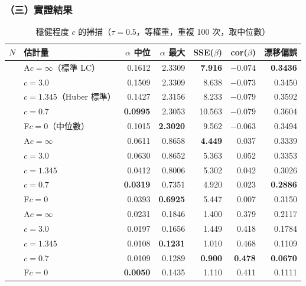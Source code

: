 \documentclass[UTF8, fontset=macnew, a4paper, 12pt]{ctexart}
\begin{document}
\subsubsection{（三）實證結果}

\begin{table}[H]
\centering
\caption{穩健程度 $c$ 的掃描（$\tau=0.5$，等權重，重複 100 次，取中位數）}
\small
\begin{tabular}{llrrrrr}
\toprule
$N$ & 估計量 & $\alpha$ 中位 & $\alpha$ 最大 & SSE($\beta$) & cor($\beta$) & 漂移偏誤\\
\midrule
{}
 & A\quad $c=\infty$（標準 LC）  & 0.1612 & 2.3309 & \textbf{7.916} & $-0.074$ & \textbf{0.3436}\\
 & $c=3.0$                      & 0.1509 & 2.3309 & 8.638 & $-0.073$ & 0.3450\\
 & $c=1.345$（Huber 標準）      & 0.1427 & 2.3156 & 8.233 & $-0.079$ & 0.3592\\
 & $c=0.7$                      & \textbf{0.0995} & 2.3053 & 10.563 & $-0.079$ & 0.3604\\
 & F\quad $c=0$（中位數）        & 0.1015 & \textbf{2.3020} & 9.562 & $-0.063$ & 0.3494\\
\midrule
{}
 & A\quad $c=\infty$            & 0.0611 & 0.8658 & \textbf{4.449} & 0.037 & 0.3339\\
 & $c=3.0$                      & 0.0630 & 0.8652 & 5.363 & 0.052 & 0.3353\\
 & $c=1.345$                    & 0.0412 & 0.8006 & 5.302 & 0.042 & 0.3026\\
 & $c=0.7$                      & \textbf{0.0319} & 0.7351 & 4.920 & 0.023 & \textbf{0.2886}\\
 & F\quad $c=0$                 & 0.0393 & \textbf{0.6925} & 5.447 & 0.007 & 0.3150\\
\midrule
{}
 & A\quad $c=\infty$            & 0.0231 & 0.1846 & 1.400 & 0.379 & 0.2117\\
 & $c=3.0$                      & 0.0197 & 0.1656 & 1.449 & 0.418 & 0.1784\\
 & $c=1.345$                    & 0.0108 & \textbf{0.1231} & 1.010 & 0.468 & 0.1109\\
 & $c=0.7$                      & 0.0109 & 0.1289 & \textbf{0.900} & \textbf{0.478} & \textbf{0.0670}\\
 & F\quad $c=0$                 & \textbf{0.0050} & 0.1435 & 1.110 & 0.411 & 0.1111\\
\bottomrule
\end{tabular}
\label{tab:mqc}
\end{table}
\end{document}

